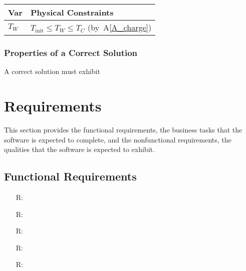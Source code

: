 \documentclass[12pt]{article}
\newcommand{\aref}[1]{A\ref{#1}}
\newcounter{reqnum} %
\begin{document}
\begin{table}[!h]
\caption{Output Variables} \label{TblOutputVar}
\renewcommand{\arraystretch}{1.2}
\noindent \begin{longtable*}{l l} 
  \toprule
  \textbf{Var} & \textbf{Physical Constraints} \\
  \midrule 
  $T_W$ & $T_\text{init} \leq T_W \leq T_C$ (by~\aref{A_charge})
  \\
  \bottomrule
\end{longtable*}
\end{table}

\subsubsection{Properties of a Correct Solution} \label{sec_CorrectSolution}

\noindent
A correct solution must exhibit 

\section{Requirements}
\label{requirements}

This section provides the functional requirements, the business tasks that the
software is expected to complete, and the nonfunctional requirements, the
qualities that the software is expected to exhibit.

\subsection{Functional Requirements}

\noindent \begin{itemize}

\item[R\refstepcounter{reqnum}\thereqnum \label{R_Inputs}:] 

\item[R\refstepcounter{reqnum}\thereqnum \label{R_OutputInputs}:] 

\item[R\refstepcounter{reqnum}\thereqnum \label{R_Calculate}:] 

\item[R\refstepcounter{reqnum}\thereqnum \label{R_VerifyOutput}:]

\item[R\refstepcounter{reqnum}\thereqnum \label{R_Output}:] 

\end{itemize}
\end{document}
